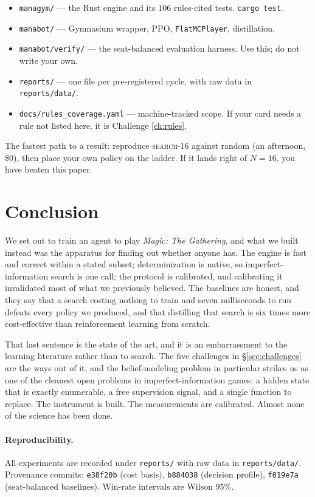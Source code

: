 \documentclass[11pt]{article}
\newcommand{\searchn}[1]{\textsc{search}-#1}
\newcounter{challenge}
\begin{document}
\begin{itemize}\itemsep1pt
\item \texttt{managym/} --- the Rust engine and its 106 rules-cited tests. \texttt{cargo test}.
\item \texttt{manabot/} --- Gymnasium wrapper, PPO, \texttt{FlatMCPlayer}, distillation.
\item \texttt{manabot/verify/} --- the seat-balanced evaluation harness. Use this; do not write your own.
\item \texttt{reports/} --- one file per pre-registered cycle, with raw data in \texttt{reports/data/}.
\item \texttt{docs/rules\_coverage.yaml} --- machine-tracked scope. If your card needs a rule not listed here, it is Challenge \ref{ch:rules}.
\end{itemize}

The fastest path to a result: reproduce \searchn{16} against random (an afternoon, \$0), then place your own policy on the ladder. If it lands right of $N=16$, you have beaten this paper.

\section{Conclusion}

We set out to train an agent to play \textit{Magic: The Gathering}, and what we built instead was the apparatus for finding out whether anyone has. The engine is fast and correct within a stated subset; determinization is native, so imperfect-information search is one call; the protocol is calibrated, and calibrating it invalidated most of what we previously believed. The baselines are honest, and they say that a search costing nothing to train and seven milliseconds to run defeats every policy we produced, and that distilling that search is six times more cost-effective than reinforcement learning from scratch.

That last sentence is the state of the art, and it is an embarrassment to the learning literature rather than to search. The five challenges in \S\ref{sec:challenges} are the ways out of it, and the belief-modeling problem in particular strikes us as one of the cleanest open problems in imperfect-information games: a hidden state that is exactly enumerable, a free supervision signal, and a single function to replace. The instrument is built. The measurements are calibrated. Almost none of the science has been done.

\paragraph{Reproducibility.} All experiments are recorded under \texttt{reports/} with raw data in \texttt{reports/data/}. Provenance commits: \texttt{e38f20b} (cost basis), \texttt{b884038} (decision profile), \texttt{f019e7a} (seat-balanced baselines). Win-rate intervals are Wilson $95\%$.



\end{document}
